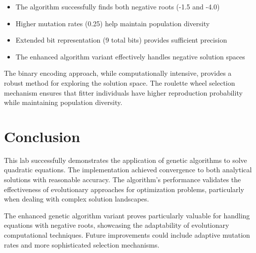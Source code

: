 \documentclass[11pt,a4paper]{article}
\begin{document}
\begin{itemize}
\item The algorithm successfully finds both negative roots (-1.5 and -4.0)
\item Higher mutation rates (0.25) help maintain population diversity
\item Extended bit representation (9 total bits) provides sufficient precision
\item The enhanced algorithm variant effectively handles negative solution spaces
\end{itemize}

The binary encoding approach, while computationally intensive, provides a robust method for exploring the solution space. The roulette wheel selection mechanism ensures that fitter individuals have higher reproduction probability while maintaining population diversity.

\section{Conclusion}

This lab successfully demonstrates the application of genetic algorithms to solve quadratic equations. The implementation achieved convergence to both analytical solutions with reasonable accuracy. The algorithm's performance validates the effectiveness of evolutionary approaches for optimization problems, particularly when dealing with complex solution landscapes.

The enhanced genetic algorithm variant proves particularly valuable for handling equations with negative roots, showcasing the adaptability of evolutionary computational techniques. Future improvements could include adaptive mutation rates and more sophisticated selection mechanisms.
\end{document}
